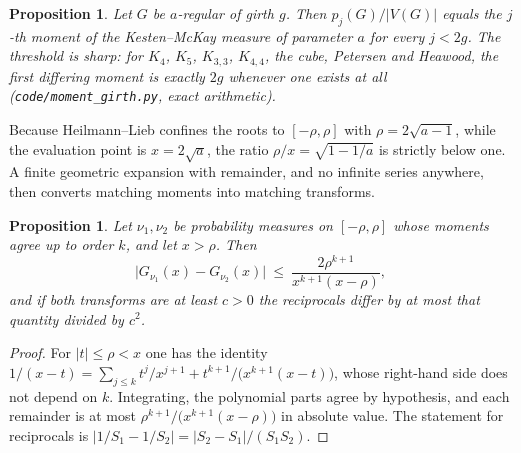 \documentclass[11pt]{article}
\newtheorem{proposition}[theorem]{Proposition}
\theoremstyle{remark}
\begin{document}
\begin{proposition}\label{prop:km-moments}
Let $G$ be $a$-regular of girth $g$. Then $p_j(G)/|V(G)|$ equals the $j$-th moment of the
Kesten--McKay measure of parameter $a$ for every $j<2g$. The threshold is sharp: for
$K_4$, $K_5$, $K_{3,3}$, $K_{4,4}$, the cube, Petersen and Heawood, the first differing
moment is exactly $2g$ whenever one exists at all
\textup{(}\texttt{code/moment\_girth.py}, exact arithmetic\textup{)}.
\end{proposition}

Because Heilmann--Lieb confines the roots to $[-\rho,\rho]$ with $\rho=2\sqrt{a-1}$, while
the evaluation point is $x=2\sqrt a$, the ratio $\rho/x=\sqrt{1-1/a}$ is strictly below
one. A finite geometric expansion with remainder, and no infinite series anywhere, then
converts matching moments into matching transforms.

\begin{proposition}\label{prop:transfer}
Let $\nu_1,\nu_2$ be probability measures on $[-\rho,\rho]$ whose moments agree up to order
$k$, and let $x>\rho$. Then
\[
\bigl|G_{\nu_1}(x)-G_{\nu_2}(x)\bigr|\ \le\ \frac{2\rho^{k+1}}{x^{k+1}(x-\rho)},
\]
and if both transforms are at least $c>0$ the reciprocals differ by at most that quantity
divided by $c^2$.
\end{proposition}

\begin{proof}
For $|t|\le\rho<x$ one has the identity
$1/(x-t)=\sum_{j\le k}t^j/x^{j+1}+t^{k+1}/\bigl(x^{k+1}(x-t)\bigr)$, whose right-hand side
does not depend on $k$. Integrating, the polynomial parts agree by hypothesis, and each
remainder is at most $\rho^{k+1}/\bigl(x^{k+1}(x-\rho)\bigr)$ in absolute value. The
statement for reciprocals is $|1/S_1-1/S_2|=|S_2-S_1|/(S_1S_2)$.
\end{proof}
\end{document}
